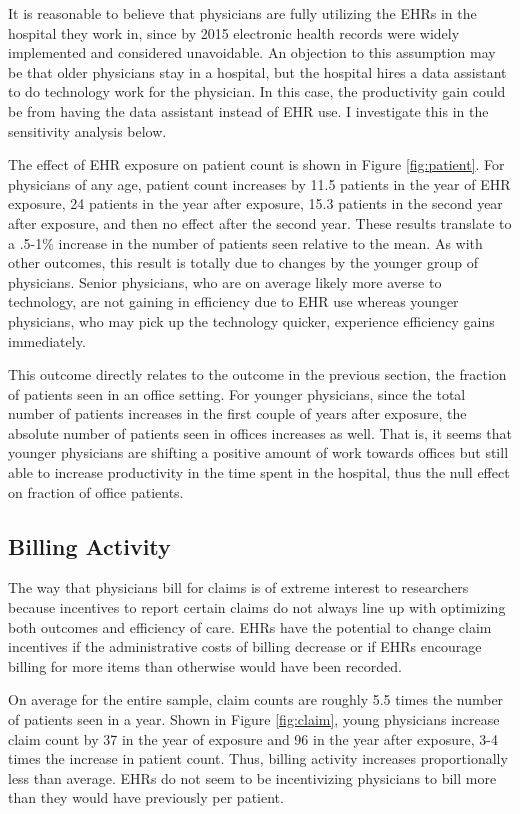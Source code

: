 \documentclass[11pt]{article}
\begin{document}
It is reasonable to believe that physicians are fully utilizing the EHRs in the hospital they work in, since by 2015 electronic health records were widely implemented and considered unavoidable. An objection to this assumption may be that older physicians stay in a hospital, but the hospital hires a data assistant to do technology work for the physician. In this case, the productivity gain could be from having the data assistant instead of EHR use. I investigate this in the sensitivity analysis below.

The effect of EHR exposure on patient count is shown in Figure \ref{fig:patient}. For physicians of any age, patient count increases by 11.5 patients in the year of EHR exposure, 24 patients in the year after exposure, 15.3 patients in the second year after exposure, and then no effect after the second year. These results translate to a .5-1\% increase in the number of patients seen relative to the mean. As with other outcomes, this result is totally due to changes by the younger group of physicians. Senior physicians, who are on average likely more averse to technology, are not gaining in efficiency due to EHR use whereas younger physicians, who may pick up the technology quicker, experience efficiency gains immediately.

This outcome directly relates to the outcome in the previous section, the fraction of patients seen in an office setting. For younger physicians, since the total number of patients increases in the first couple of years after exposure, the absolute number of patients seen in offices increases as well. That is, it seems that younger physicians are shifting a positive amount of work towards offices but still able to increase productivity in the time spent in the hospital, thus the null effect on fraction of office patients. 


\subsection{Billing Activity}

The way that physicians bill for claims is of extreme interest to researchers because incentives to report certain claims do not always line up with optimizing both outcomes and efficiency of care. EHRs have the potential to change claim incentives if the administrative costs of billing decrease or if EHRs encourage billing for more items than otherwise would have been recorded. 

On average for the entire sample, claim counts are roughly 5.5 times the number of patients seen in a year. Shown in Figure \ref{fig:claim}, young physicians increase claim count by 37 in the year of exposure and 96 in the year after exposure, 3-4 times the increase in patient count. Thus, billing activity increases proportionally less than average. EHRs do not seem to be incentivizing physicians to bill more than they would have previously per patient. 
\end{document}

